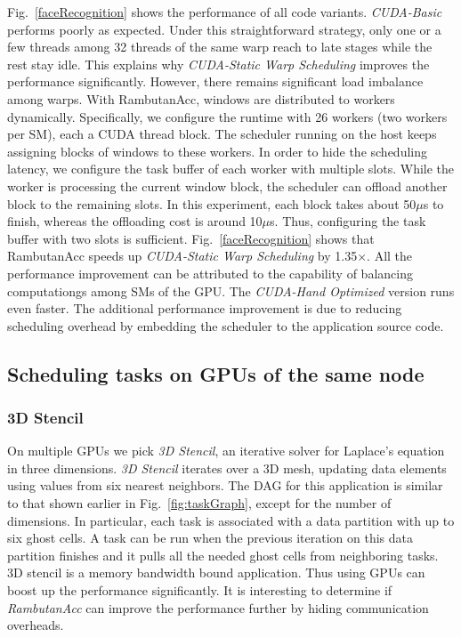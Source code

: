 Fig.~\ref{faceRecognition} shows the performance of all code variants.
{\em CUDA-Basic} performs poorly as expected.
Under this straightforward strategy, only one or a few threads among 32 threads of the same warp reach to late stages while the rest stay idle.
This explains why {\em CUDA-Static Warp Scheduling} improves the performance significantly.
However, there remains significant load imbalance among warps.
With RambutanAcc, windows are distributed to workers dynamically.
Specifically, we configure the runtime with 26 workers (two workers per SM), each a CUDA thread block. 
The scheduler running on the host keeps assigning blocks of windows to these workers.
In order to hide the scheduling latency, we configure the task buffer of each worker with multiple slots.
While the worker is processing the current window block, the scheduler can offload another block to the remaining slots.
In this experiment, each block takes about 50$\mu$s to finish, whereas the offloading cost is around 10$\mu$s.
Thus, configuring the task buffer with two slots is sufficient.
Fig.~\ref{faceRecognition} shows that RambutanAcc speeds up {\em CUDA-Static Warp Scheduling} by 1.35$\times$.
All the performance improvement can be attributed to the capability of balancing computationgs among SMs of the GPU.
The {\em CUDA-Hand Optimized} version runs even faster.
The additional performance improvement is due to reducing scheduling overhead by embedding the scheduler to the application source code.


\subsection{Scheduling tasks on GPUs of the same node}

\subsubsection{3D Stencil}
On multiple GPUs we pick {\em 3D Stencil}, an iterative solver for Laplace's equation in three dimensions.
{\em 3D Stencil} iterates over a 3D mesh, updating data elements using values from six nearest neighbors.
The DAG for this application is similar to that shown earlier in Fig.~\ref{fig:taskGraph}, except for the number of dimensions.
In particular, each task is associated with a data partition with up to six ghost cells.
A task can be run when the previous iteration on this data partition finishes and it pulls all the needed ghost cells from neighboring tasks.
3D stencil is a memory bandwidth bound application. 
Thus using GPUs can boost up the performance significantly.
It is interesting to determine if {\em RambutanAcc} can improve the performance further by  hiding communication overheads.

